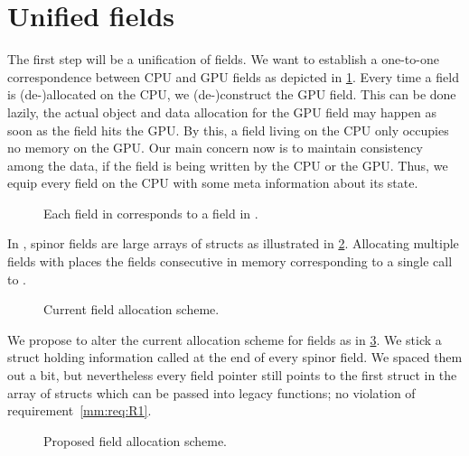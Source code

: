\section{Unified fields}

The first step will be a unification of fields.
We want to establish a one-to-one correspondence between CPU and GPU fields as depicted in \cref{fig:mm:field0:correspondence}.
Every time a field is (de-)allocated on the CPU, we (de-)construct the GPU field.
This can be done lazily, \ie the actual object and data allocation for the GPU field may happen as soon as the field hits the GPU.
By this, a field living on the CPU only occupies no memory on the GPU.
Our main concern now is to maintain consistency among the data, if the field is being written by the CPU or the GPU.
Thus, we equip every field on the CPU with some meta information about its state.

\begin{figure}
  
  \caption{Each field in \openqxd corresponds to a field in \quda.}
  \label{fig:mm:field0:correspondence}
\end{figure}

In \openqxd, spinor fields are large arrays of structs as illustrated in \cref{fig:mm:field1:current_scheme}.
Allocating multiple fields with  places the fields consecutive in memory corresponding to a single call to .

\begin{figure}
  
  \caption{Current field allocation scheme.}
  \label{fig:mm:field1:current_scheme}
\end{figure}

We propose to alter the current allocation scheme for fields as in \cref{fig:mm:field2:proposed_scheme}.
We stick a struct holding information called  at the end of every spinor field.
We spaced them out a bit, but nevertheless every field pointer still points to the first struct in the array of structs which can be passed into legacy functions; no violation of requirement~\ref{mm:req:R1}.

\begin{figure}
  
  \caption{Proposed field allocation scheme.}
  \label{fig:mm:field2:proposed_scheme}
\end{figure}

